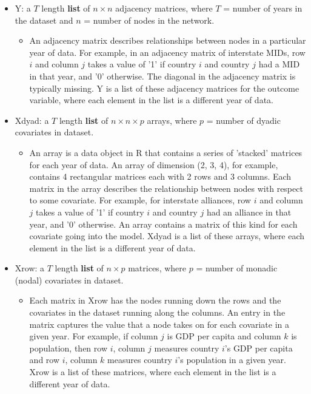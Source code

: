 \begin{itemize}[noitemsep,nolistsep]
    \item Y: a $T$ length \textbf{list} of $n\times n$ adjacency matrices, where $T$ = number of years in the dataset and $n$ = number of nodes in the network.
    \begin{itemize}
      \item An adjacency matrix describes relationships between nodes in a particular year of data. For example, in an adjacency matrix of interstate MIDs, row $i$ and column $j$ takes a value of '1' if country $i$ and country $j$ had a MID in that year, and '0' otherwise. The diagonal in the adjacency matrix is typically missing. Y is a list of these adjacency matrices for the outcome variable, where each element in the list is a different year of data.
    \end{itemize}
    \item Xdyad: a $T$ length \textbf{list} of $n\times n\times p$ arrays, where $p$ = number of dyadic covariates in dataset.
    \begin{itemize}
      \item An array is a data object in R that contains a series of 'stacked' matrices for each year of data. An array of dimension (2, 3, 4), for example, contains 4 rectangular matrices each with 2 rows and 3 columns. Each matrix in the array describes the relationship between nodes with respect to some covariate. For example, for interstate alliances, row $i$ and column $j$ takes a value of '1' if country $i$ and country $j$ had an alliance in that year, and '0' otherwise. An array contains a matrix of this kind for each covariate going into the model. Xdyad is a list of these arrays, where each element in the list is a different year of data.
    \end{itemize}
    \item Xrow: a $T$ length \textbf{list} of $n\times p$ matrices, where $p$ = number of monadic (nodal) covariates in dataset.
    \begin{itemize}
      \item Each matrix in Xrow has the nodes running down the rows and the covariates in the dataset running along the columns. An entry in the matrix captures the value that a node takes on for each covariate in a given year. For example, if column $j$ is GDP per capita and column $k$ is population, then row $i$, column $j$ measures country $i$'s GDP per capita and row $i$, column $k$ measures country $i$'s population in a given year. Xrow is a list of these matrices, where each element in the list is a different year of data.
    \end{itemize}
\end{itemize}

